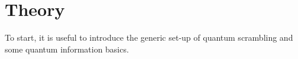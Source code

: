 \section{Theory}

To start, it is useful to introduce the generic set-up of quantum scrambling and some quantum information basics.
